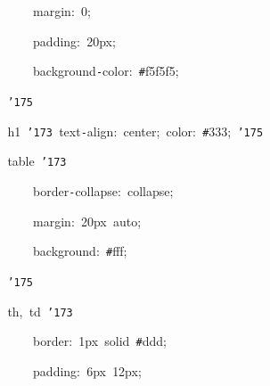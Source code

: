\documentclass[a4paper,10pt]{article}
\def\mc{\relax}
\begin{document}
\noindent
\mbox{}{\tt\mc \ }{\tt\mc \ }{\tt\mc \ }{\tt\mc \ }{\tt\mc \ }{\tt\mc \ }{\tt\mc \ }{\tt\mc \ }{\tt\mc \ }{\tt\mc \ }{\tt\mc \ }{\tt\mc \ }margin:{\tt\mc \ }0;

\noindent
\mbox{}{\tt\mc \ }{\tt\mc \ }{\tt\mc \ }{\tt\mc \ }{\tt\mc \ }{\tt\mc \ }{\tt\mc \ }{\tt\mc \ }{\tt\mc \ }{\tt\mc \ }{\tt\mc \ }{\tt\mc \ }padding:{\tt\mc \ }20px;

\noindent
\mbox{}{\tt\mc \ }{\tt\mc \ }{\tt\mc \ }{\tt\mc \ }{\tt\mc \ }{\tt\mc \ }{\tt\mc \ }{\tt\mc \ }{\tt\mc \ }{\tt\mc \ }{\tt\mc \ }{\tt\mc \ }background{\tt -}color:{\tt\mc \ }{\tt\#}f5f5f5;

\noindent
\mbox{}{\tt\mc \ }{\tt\mc \ }{\tt\mc \ }{\tt\mc \ }{\tt\mc \ }{\tt\mc \ }{\tt\mc \ }{\tt\mc \ }{\tt\char'175}

\noindent
\mbox{}{\tt\mc \ }{\tt\mc \ }{\tt\mc \ }{\tt\mc \ }{\tt\mc \ }{\tt\mc \ }{\tt\mc \ }{\tt\mc \ }h1{\tt\mc \ }{\tt\char'173}{\tt\mc \ }text{\tt -}align:{\tt\mc \ }center;{\tt\mc \ }color:{\tt\mc \ }{\tt\#}333;{\tt\mc \ }{\tt\char'175}

\noindent
\mbox{}{\tt\mc \ }{\tt\mc \ }{\tt\mc \ }{\tt\mc \ }{\tt\mc \ }{\tt\mc \ }{\tt\mc \ }{\tt\mc \ }table{\tt\mc \ }{\tt\char'173}

\noindent
\mbox{}{\tt\mc \ }{\tt\mc \ }{\tt\mc \ }{\tt\mc \ }{\tt\mc \ }{\tt\mc \ }{\tt\mc \ }{\tt\mc \ }{\tt\mc \ }{\tt\mc \ }{\tt\mc \ }{\tt\mc \ }border{\tt -}collapse:{\tt\mc \ }collapse;

\noindent
\mbox{}{\tt\mc \ }{\tt\mc \ }{\tt\mc \ }{\tt\mc \ }{\tt\mc \ }{\tt\mc \ }{\tt\mc \ }{\tt\mc \ }{\tt\mc \ }{\tt\mc \ }{\tt\mc \ }{\tt\mc \ }margin:{\tt\mc \ }20px{\tt\mc \ }auto;

\noindent
\mbox{}{\tt\mc \ }{\tt\mc \ }{\tt\mc \ }{\tt\mc \ }{\tt\mc \ }{\tt\mc \ }{\tt\mc \ }{\tt\mc \ }{\tt\mc \ }{\tt\mc \ }{\tt\mc \ }{\tt\mc \ }background:{\tt\mc \ }{\tt\#}fff;

\noindent
\mbox{}{\tt\mc \ }{\tt\mc \ }{\tt\mc \ }{\tt\mc \ }{\tt\mc \ }{\tt\mc \ }{\tt\mc \ }{\tt\mc \ }{\tt\char'175}

\noindent
\mbox{}{\tt\mc \ }{\tt\mc \ }{\tt\mc \ }{\tt\mc \ }{\tt\mc \ }{\tt\mc \ }{\tt\mc \ }{\tt\mc \ }th,{\tt\mc \ }td{\tt\mc \ }{\tt\char'173}

\noindent
\mbox{}{\tt\mc \ }{\tt\mc \ }{\tt\mc \ }{\tt\mc \ }{\tt\mc \ }{\tt\mc \ }{\tt\mc \ }{\tt\mc \ }{\tt\mc \ }{\tt\mc \ }{\tt\mc \ }{\tt\mc \ }border:{\tt\mc \ }1px{\tt\mc \ }solid{\tt\mc \ }{\tt\#}ddd;

\noindent
\mbox{}{\tt\mc \ }{\tt\mc \ }{\tt\mc \ }{\tt\mc \ }{\tt\mc \ }{\tt\mc \ }{\tt\mc \ }{\tt\mc \ }{\tt\mc \ }{\tt\mc \ }{\tt\mc \ }{\tt\mc \ }padding:{\tt\mc \ }6px{\tt\mc \ }12px;
\end{document}
